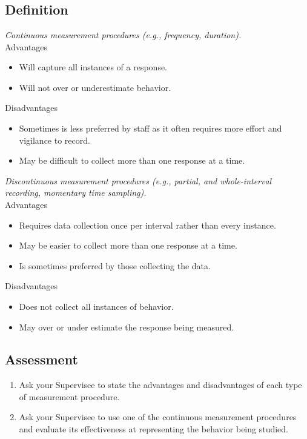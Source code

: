 \clearpage \section[\fourFKFourtyEight{}]{\fourFKFourtyEight{}%
              }
\subsection{Definition}
\textit{Continuous measurement procedures (e.g., frequency, duration).}\\
Advantages
\begin{itemize}
\item Will capture all instances of a response.
\item Will not over or underestimate behavior.
\end{itemize}
Disadvantages
\begin{itemize}
\item Sometimes is less preferred by staff as it often requires more effort and vigilance to record.
\item May be difficult to collect more than one response at a time.
\end{itemize}
%
\textit{Discontinuous measurement procedures (e.g., partial, and whole-interval recording, momentary time sampling).}\\
Advantages
\begin{itemize}
\item Requires data collection once per interval rather than every instance.
\item May be easier to collect more than one response at a time.
\item Is sometimes preferred by those collecting the data.
\end{itemize}

Disadvantages
\begin{itemize}
\item Does not collect all instances of behavior.
\item May over or under estimate the response being measured.
\end{itemize}
%
\subsection{Assessment}
\begin{enumerate}
\item Ask your Supervisee to state the advantages and disadvantages of each type of measurement procedure. 
\item Ask your Supervisee to use one of the continuous measurement procedures and evaluate its effectiveness at representing the behavior being studied.
\end{enumerate}
%
